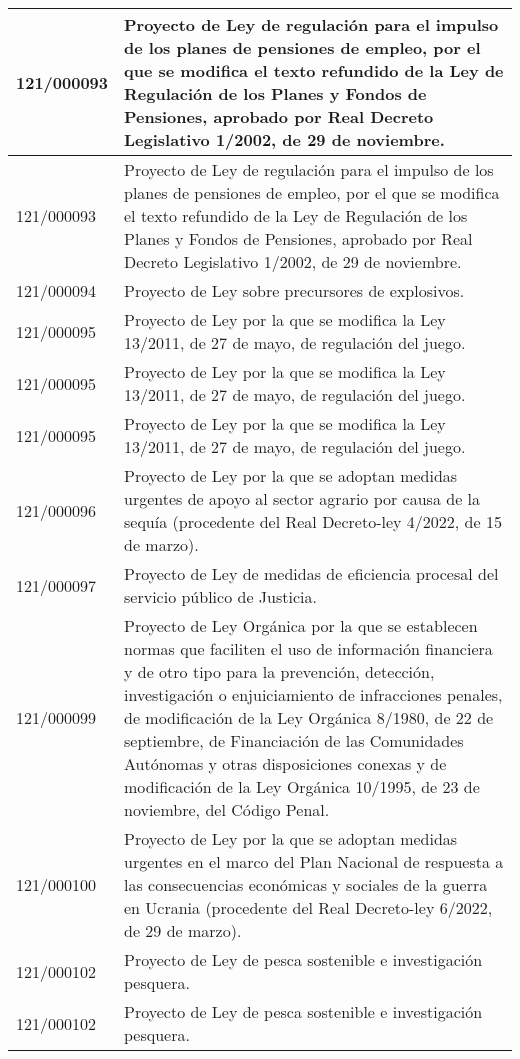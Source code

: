 {\begin{table}[H]
\begin{center}
\begin{tabularx}{\linewidth}{| l | X |}
\hline
121/000093 & Proyecto de Ley de regulación para el impulso de los planes de pensiones de empleo, por el que se modifica el texto refundido de la Ley de Regulación de los Planes y Fondos de Pensiones, aprobado por Real Decreto Legislativo 1/2002, de 29 de noviembre. \\
\hline
121/000093 & Proyecto de Ley de regulación para el impulso de los planes de pensiones de empleo, por el que se modifica el texto refundido de la Ley de Regulación de los Planes y Fondos de Pensiones, aprobado por Real Decreto Legislativo 1/2002, de 29 de noviembre. \\
\hline
121/000094 & Proyecto de Ley sobre precursores de explosivos. \\
\hline
121/000095 & Proyecto de Ley por la que se modifica la Ley 13/2011, de 27 de mayo, de regulación del juego. \\
\hline
121/000095 & Proyecto de Ley por la que se modifica la Ley 13/2011, de 27 de mayo, de regulación del juego. \\
\hline
121/000095 & Proyecto de Ley por la que se modifica la Ley 13/2011, de 27 de mayo, de regulación del juego. \\
\hline
121/000096 & Proyecto de Ley por la que se adoptan medidas urgentes de apoyo al sector agrario por causa de la sequía (procedente del Real Decreto-ley 4/2022, de 15 de marzo). \\
\hline
121/000097 & Proyecto de Ley de medidas de eficiencia procesal del servicio público de Justicia. \\
\hline
121/000099 & Proyecto de Ley Orgánica por la que se establecen normas que faciliten el uso de información financiera y de otro tipo para la prevención, detección, investigación o enjuiciamiento de infracciones penales, de modificación de la Ley Orgánica 8/1980, de 22 de septiembre, de Financiación de las Comunidades Autónomas y otras disposiciones conexas y de modificación de la Ley Orgánica 10/1995, de 23 de noviembre, del Código Penal. \\
\hline
121/000100 & Proyecto de Ley por la que se adoptan medidas urgentes en el marco del Plan Nacional de respuesta a las consecuencias económicas y sociales de la guerra en Ucrania (procedente del Real Decreto-ley 6/2022, de 29 de marzo). \\
\hline
121/000102 & Proyecto de Ley de pesca sostenible e investigación pesquera. \\
\hline
121/000102 & Proyecto de Ley de pesca sostenible e investigación pesquera. \\

\end{tabularx}
\end{center}
\end{table}}
